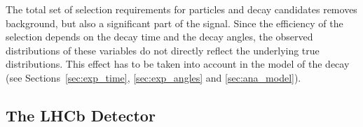 The total set of selection requirements for particles and decay candidates removes background, but also a significant part of the signal.
Since the efficiency of the selection depends on the decay time and the decay angles, the observed distributions of these variables do not
directly reflect the underlying true distributions. This effect has to be taken into account in the model of the decay (see
Sections~\ref{sec:exp_time}, \ref{sec:exp_angles} and \ref{sec:ana_model}).


\subsection{The LHCb Detector}
\label{subsec:intro_LHCb_detector}


